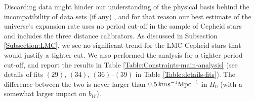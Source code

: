 
Discarding data might hinder our understanding of the physical basis behind the incompatibility of data sets (if any) \cite{Press:1996fw}, and for that reason our best estimate of the universe's expansion rate uses no period cut-off in the sample of Cepheid stars and includes the three distance calibrators.    
As discussed in Subsection \ref{Subsection:LMC}, we see no significant trend for the LMC Cepheid stars that would justify a tighter cut. We also performed the analysis for a tighter period cut-off, and report the results in Table \ref{Table:Constraints-main-analysis} (see details of fits $(29),\,(34),\,(36)$--$(39)$ in Table \ref{Table:details-fits}).
The difference between the two is never larger than $0.5\, \mathrm{km} \mathrm{s}^{-1} \mathrm{Mpc}^{-1}$ in $H_0$ (with a somewhat larger impact on $b_W$). %

